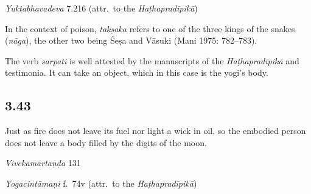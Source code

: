 \begin{ekdosis}
\begin{testimonia}[hp03_042]
\emph{Yuktabhavadeva} 7.216 (attr.~to the \emph{Haṭhapradīpikā})
\begin{versinnote}
\end{versinnote}
\end{testimonia}

\begin{philcomm}[hp03_042]
In the context of poison, \emph{takṣaka} refers to one of the three kings of the snakes (\emph{nāga}), the other two being Śeṣa and Vāsuki (Mani 1975: 782–783). %

The verb \emph{sarpati} is well attested by the manuscripts of the \emph{Haṭhapradīpikā} and testimonia. It can take an object, which in this case is the yogi's body.
\end{philcomm}

\subsection*{3.43}
\begin{translation}[hp03_043]
Just as fire does not leave its fuel nor light a wick in oil,
so the embodied person does not leave a body filled by the digits of the moon.
\end{translation}

\begin{sources}[hp03_043]
\emph{Vivekamārtaṇḍa} 131
\begin{versinnote}
\tl{\var{°vartiṃ ca ] °vartīva, °vartti ca \vl}\\!}
\end{versinnote}
\end{sources}

\begin{testimonia}[hp03_043]
\emph{Yogacintāmaṇi} f.~74v (attr.~to the \emph{Haṭhapradīpikā})
\begin{versinnote}
\end{versinnote}
\end{testimonia}


\end{ekdosis}
